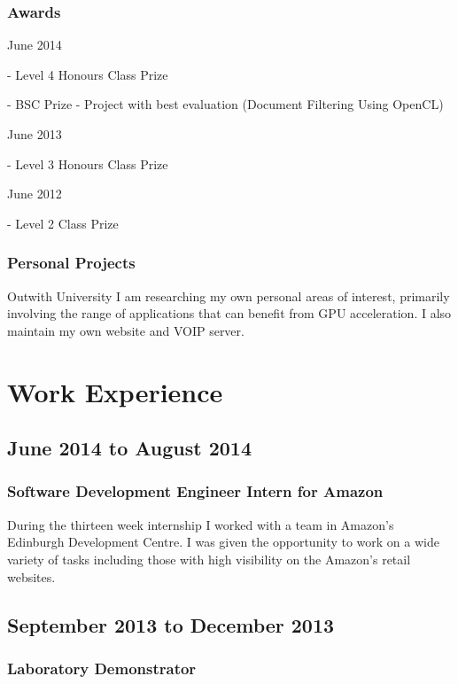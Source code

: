 \documentclass[11pt,a4paper]{article}
\begin{document}
\subsubsection*{Awards}

June 2014

- Level 4 Honours Class Prize

- BSC Prize - Project with best evaluation (Document Filtering Using OpenCL)

June 2013

- Level 3 Honours Class Prize

June 2012

- Level 2 Class Prize

\subsubsection*{Personal Projects}

Outwith University I am researching my own personal areas of interest, primarily
involving the range of applications that can benefit from GPU acceleration. I
also maintain my own website and VOIP server.

\section*{Work Experience}

\subsection*{June 2014 to August 2014}

\subsubsection*{Software Development Engineer Intern for Amazon}

During the thirteen week internship I worked with a team in Amazon's Edinburgh
Development Centre. I was given the opportunity to work on a wide variety of
tasks including those with high visibility on the Amazon's retail websites.

\subsection*{September 2013 to December 2013}

\subsubsection*{Laboratory Demonstrator}
\end{document}
